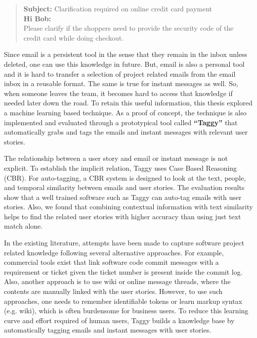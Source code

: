 \begin{quote}
\textbf{Subject:} Clarification required on online credit card payment\\
\textbf{Hi Bob:}\\
Please clarify if the shoppers need to provide the security code of the credit card while doing checkout.
\end{quote}

Since email is a persistent tool in the sense that they remain in the inbox unless deleted, one can use this knowledge in future. But, email is also a personal tool and it is hard to transfer a selection of project related emails from the email inbox in a reusable format. The same is true for instant messages as well. So, when someone leaves the team, it becomes hard to access that knowledge if needed later down the road. To retain this useful information, this thesis explored a machine learning based technique. As a proof of concept, the technique is also implemented and evaluated through a prototypical tool called \textbf{``Taggy''} that automatically grabs and tags the emails and instant messages with relevant user stories.

The relationship between a user story and email or instant message is not explicit. To establish the implicit relation, Taggy uses  Case Based Reasoning (CBR). For auto-tagging, a CBR system is designed to look at the text, people, and temporal similarity between emails and user stories. The evaluation results show that a well trained software such as Taggy can auto-tag emails with user stories. Also, we found that combining contextual information with text similarity helps to find the related user stories with higher accuracy than using just text match alone.

In the existing literature, attempts have been made to capture software project related knowledge following several alternative approaches. For example, commercial tools exist that link software code commit messages with a requirement or ticket given the ticket number is present inside the commit log. Also, another approach is to use wiki or online message threads, where the contents are manually linked with the user stories. However, to use such approaches, one needs to remember identifiable tokens or learn markup syntax (e.g. wiki), which is often burdensome for business users. To reduce this learning curve and effort required of human users, Taggy builds a knowledge base by automatically tagging emails and instant messages with user stories. 

